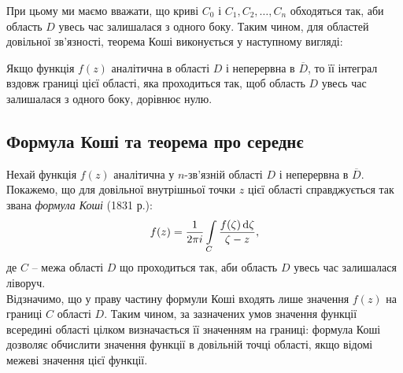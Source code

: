 При цьому ми маємо вважати, що криві $C_0$ і $C_1, C_2, \ldots, C_n$ обходяться так, аби область $D$ увесь час залишалася з одного боку. Таким чином, для областей довільної зв'язності, теорема Коші виконується у наступному вигляді:
\begin{theorem}
Якщо функція $f(z)$ аналітична в області $D$ і неперервна в $\overline{D}$, то її інтеграл вздовж границі цієї області, яка проходиться так, щоб область $D$ увесь час залишалася з одного боку, дорівнює нулю.
\end{theorem}

\subsection{Формула Коші та теорема про середнє}
Нехай функція $f(z)$ аналітична у $n$-зв'язній області $D$ і неперервна в $\overline{D}$. Покажемо, що для довільної внутрішньої точки $z$ цієї області справджується так звана \textit{формула Коші} (1831 р.):
\begin{equation}
	\label{eq:4.4.1}
	f(z) = \dfrac{1}{2 \pi i} \displaystyle\int\limits_C \dfrac{f(\zeta) \mathop{}\!\mathrm{d} \zeta}{\zeta - z},
\end{equation}
де $C$ -- межа області $D$ що проходиться так, аби область $D$ увесь час залишалася ліворуч. \\

Відзначимо, що у праву частину формули Коші входять лише значення $f(z)$ на границі $C$ області $D$. Таким чином, за зазначених умов значення функції всередині області цілком визначається її значенням на границі: формула Коші дозволяє обчислити значення функції в довільній точці області, якщо відомі межеві значення цієї функції. \\

